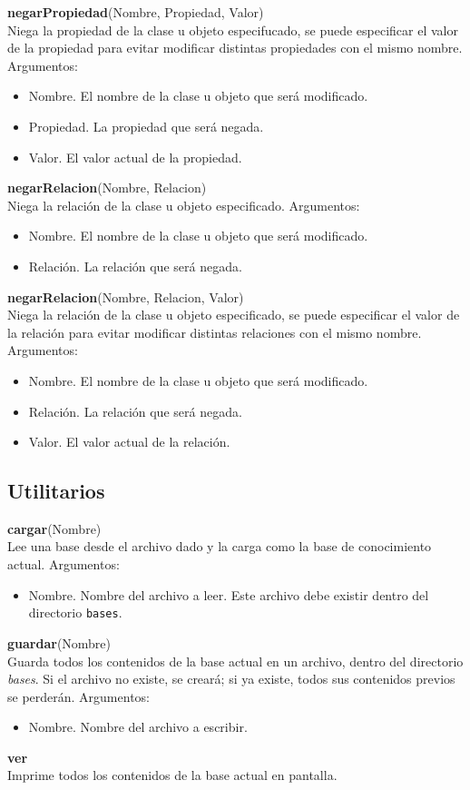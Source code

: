 \documentclass[11pt]{article}
\newcommand{\comando}[2]{
    \textbf{#1}(#2)\\
}
\newenvironment{args}{
    \newline
    Argumentos:
    \begin{itemize}
}{
    \end{itemize}
    \bigskip
}
\begin{document}
\comando{negarPropiedad}{Nombre, Propiedad, Valor}
Niega la propiedad de la clase u objeto especifucado, se puede especificar el valor de la propiedad para evitar modificar distintas propiedades con el mismo nombre.
\begin{args}
\item Nombre. El nombre de la clase u objeto que será modificado.
\item Propiedad. La propiedad que será negada.
\item Valor. El valor actual de la propiedad.
\end{args}

\comando{negarRelacion}{Nombre, Relacion}
Niega la relación de la clase u objeto especificado. 
\begin{args}
\item Nombre. El nombre de la clase u objeto que será modificado.
\item Relación. La relación que será negada.
\end{args}

\comando{negarRelacion}{Nombre, Relacion, Valor}
Niega la relación de la clase u objeto especificado, se puede especificar el valor de la relación para evitar modificar distintas relaciones con el mismo nombre.
\begin{args}
\item Nombre. El nombre de la clase u objeto que será modificado.
\item Relación. La relación que será negada.
\item Valor. El valor actual de la relación.
\end{args}


\subsection{Utilitarios}

\comando{cargar}{Nombre}
Lee una base desde el archivo dado y la carga como la base de conocimiento actual.
\begin{args}
    \item Nombre. Nombre del archivo a leer. Este archivo debe existir dentro del directorio \texttt{bases}.
\end{args}

\comando{guardar}{Nombre}
Guarda todos los contenidos de la base actual en un archivo, dentro del directorio \textit{bases}. Si el archivo no existe, se creará; si ya existe, todos sus contenidos previos se perderán.
\begin{args}
    \item Nombre. Nombre del archivo a escribir.
\end{args}

\textbf{ver}\\
Imprime todos los contenidos de la base actual en pantalla.
\end{document}
